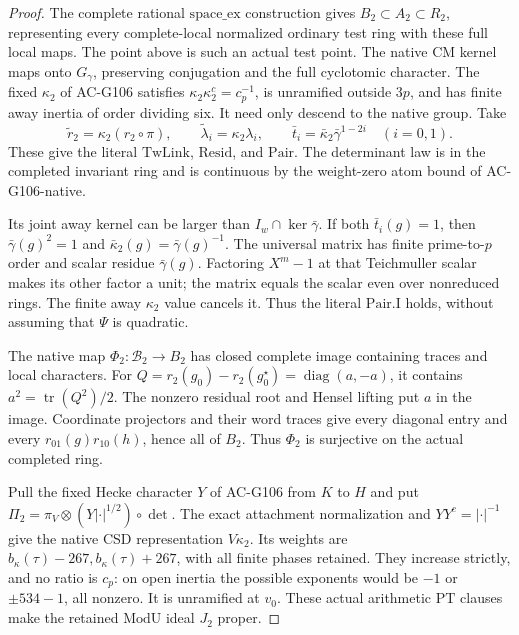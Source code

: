 \begin{proof}
The complete rational \(\mathrm{space\_ex}\) construction
gives \(B_2\subset A_2\subset R_2\), representing every
complete-local normalized ordinary test ring with these
full local maps.  The point above is such an actual test
point.  The native CM kernel maps onto \(G_\gamma\),
preserving conjugation and the full cyclotomic character.
The fixed \(\kappa_2\) of AC-G106 satisfies
\(\kappa_2\kappa_2^c=c_p^{-1}\), is unramified outside
\(3p\), and has finite away inertia of order dividing six.
It need only descend to the native group.  Take
\[
 \widetilde r_2=\kappa_2(r_2\circ\pi),\qquad
 \widetilde\lambda_i=\kappa_2\lambda_i,\qquad
 \bar t_i=\bar\kappa_2\bar\gamma^{1-2i}\quad(i=0,1).
 \tag{G136.29}
\]
These give the literal \(\mathrm{TwLink}\), \(\mathrm{Resid}\),
and \(\mathrm{Pair}\).  The determinant law is in the
completed invariant ring and is continuous by the
weight-zero atom bound of AC-G106-native.

Its joint away kernel can be larger than
\(I_w\cap\ker\bar\gamma\).  If both \(\bar t_i(g)=1\),
then \(\bar\gamma(g)^2=1\) and
\(\bar\kappa_2(g)=\bar\gamma(g)^{-1}\).
The universal matrix has finite prime-to-\(p\) order and
scalar residue \(\bar\gamma(g)\).  Factoring \(X^m-1\)
at that Teichmuller scalar makes its other factor a unit;
the matrix equals the scalar even over nonreduced rings.
The finite away \(\kappa_2\) value cancels it.  Thus the
literal \(\mathrm{Pair.I}\) holds, without assuming that
\(\Psi\) is quadratic.

The native map \(\Phi_2:\mathcal B_2\to B_2\) has closed
complete image containing traces and local characters.
For \(Q=r_2(g_0)-r_2(g_0^\star)=\operatorname{diag}(a,-a)\),
it contains \(a^2=\operatorname{tr}(Q^2)/2\).
The nonzero residual root and Hensel lifting put \(a\) in
the image.  Coordinate projectors and their word traces
give every diagonal entry and every
\(r_{01}(g)r_{10}(h)\), hence all of \(B_2\).
Thus \(\Phi_2\) is surjective on the actual completed ring.

Pull the fixed Hecke character \(Y\) of AC-G106 from \(K\)
to \(H\) and put
\(\Pi_2=\pi_V\otimes(Y|\cdot|^{1/2})\circ\det\).
The exact attachment normalization and
\(YY^c=|\cdot|^{-1}\) give the native CSD representation
\(V\kappa_2\).  Its weights are
\(b_\kappa(\tau)-267,b_\kappa(\tau)+267\), with all finite
phases retained.  They increase strictly, and no ratio
is \(c_p\): on open inertia the possible exponents would
be \(-1\) or \(\pm534-1\), all nonzero.
It is unramified at \(v_0\).  These actual arithmetic
\(\mathrm{PT}\) clauses make the retained \(\mathrm{ModU}\)
ideal \(J_2\) proper.


\end{proof}

